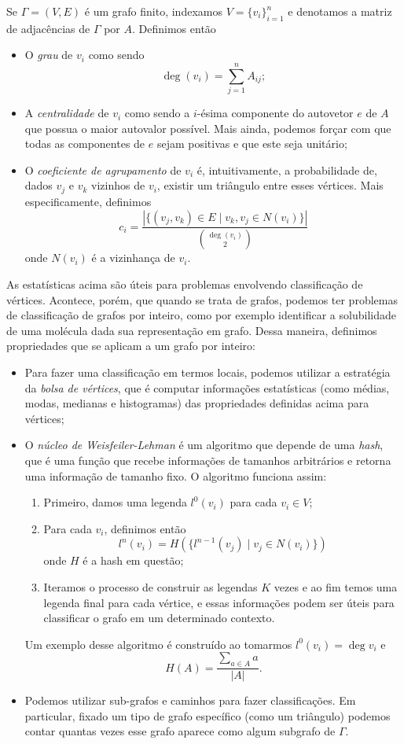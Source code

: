 \documentclass{article}
\begin{document}
Se $\Gamma = (V,E)$ é um grafo finito, indexamos $V = \{v_{i}\}_{i=1}^n$ e denotamos a matriz de adjacências de $\Gamma$ por $A$. Definimos então \begin{itemize}
    \item O \textit{grau} de $v_i$ como sendo $$\deg(v_i) = \sum_{j = 1}^n A_{ij};$$
    \item A \textit{centralidade} de $v_i$ como sendo a $i$-ésima componente do autovetor $e$ de $A$ que possua o maior autovalor possível. Mais ainda, podemos forçar com que todas as componentes de $e$ sejam positivas e que este seja unitário;
    \item O \textit{coeficiente de agrupamento} de $v_i$ é, intuitivamente, a probabilidade de, dados $v_j$ e $v_k$ vizinhos de $v_i$, existir um triângulo entre esses vértices. Mais especificamente, definimos $$c_i = \frac{|\{(v_j,v_k) \in E \mid v_k,v_j \in N(v_i)\}|}{\binom{\deg(v_i)}{2}}$$ onde $N(v_i)$ é a vizinhança de $v_i$.
\end{itemize}

As estatísticas acima são úteis para problemas envolvendo classificação de vértices. Acontece, porém, que quando se trata de grafos, podemos ter problemas de classificação de grafos por inteiro, como por exemplo identificar a solubilidade de uma molécula dada sua representação em grafo. Dessa maneira, definimos propriedades que se aplicam a um grafo por inteiro: \begin{itemize}
    \item Para fazer uma classificação em termos locais, podemos utilizar a estratégia da \textit{bolsa de vértices}, que é computar informações estatísticas (como médias, modas, medianas e histogramas) das propriedades definidas acima para vértices;
    \item O \textit{núcleo de Weisfeiler-Lehman} é um algoritmo que depende de uma \textit{hash}, que é uma função que recebe informações de tamanhos arbitrários e retorna uma informação de tamanho fixo. O algoritmo funciona assim: \begin{enumerate}
        \item Primeiro, damos uma legenda $l^0(v_i)$ para cada $v_i \in V$;
        \item Para cada $v_i$, definimos então $$l^n(v_i) = H(\{l^{n-1}(v_j) \mid v_j \in N(v_i)\})$$ onde $H$ é a hash em questão;
        \item Iteramos o processo de construir as legendas $K$ vezes e ao fim temos uma legenda final para cada vértice, e essas informações podem ser úteis para classificar o grafo em um determinado contexto.
    \end{enumerate}
    Um exemplo desse algoritmo é construído ao tomarmos $l^0(v_i) = \deg v_i$ e $$H(A) = \frac{\sum_{a \in A} a}{|A|}.$$
    \item Podemos utilizar sub-grafos e caminhos para fazer classificações. Em particular, fixado um tipo de grafo específico (como um triângulo) podemos contar quantas vezes esse grafo aparece como algum subgrafo de $\Gamma$.
\end{itemize}
\end{document}
